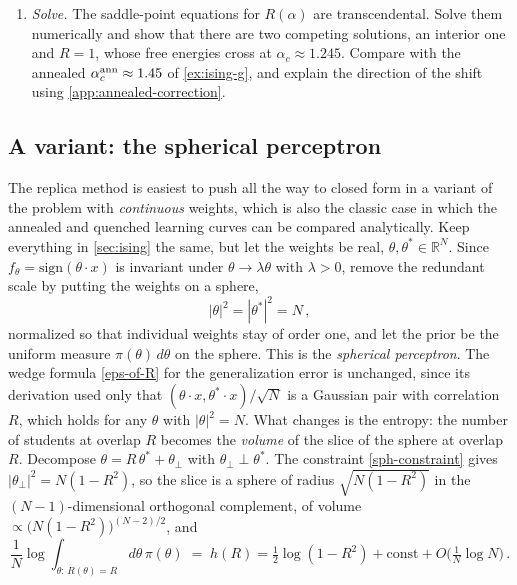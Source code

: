 \documentclass[11pt]{article}
\newcommand{\R}{\mathbb{R}}
\begin{document}
\begin{exercise}
\begin{enumerate}
    \item \emph{Solve.} The saddle-point equations for $R(\alpha)$ are transcendental. Solve them numerically and show that there are two competing solutions, an interior one and $R=1$, whose free energies cross at $\alpha_c\approx1.245$. Compare with the annealed $\alpha_c^{\rm ann}\approx1.45$ of \cref{ex:ising-g}, and explain the direction of the shift using \cref{app:annealed-correction}.
\end{enumerate}
\end{exercise}

\subsection{A variant: the spherical perceptron}
\label{app:sph-perceptron}

The replica method is easiest to push all the way to closed form in a variant of the problem with \emph{continuous} weights, which is also the classic case in which the annealed and quenched learning curves can be compared analytically. Keep everything in \cref{sec:ising} the same, but let the weights be real, $\theta,\theta^*\in\R^N$. Since $f_\theta = \mathrm{sign}(\theta\cdot x)$ is invariant under $\theta\to\lambda\theta$ with $\lambda>0$, remove the redundant scale by putting the weights on a sphere,
%
\begin{equation}
    |\theta|^2 = |\theta^*|^2 = N\,, \label{sph-constraint}
\end{equation}
%
normalized so that individual weights stay of order one, and let the prior be the uniform measure $\pi(\theta)\,d\theta$ on the sphere. This is the \emph{spherical perceptron}. The wedge formula \eqref{eps-of-R} for the generalization error is unchanged, since its derivation used only that $(\theta\cdot x,\theta^*\cdot x)/\sqrt N$ is a Gaussian pair with correlation $R$, which holds for any $\theta$ with $|\theta|^2 = N$. What changes is the entropy: the number of students at overlap $R$ becomes the \emph{volume} of the slice of the sphere at overlap $R$. Decompose $\theta = R\,\theta^* + \theta_\perp$ with $\theta_\perp\perp\theta^*$. The constraint \eqref{sph-constraint} gives $|\theta_\perp|^2 = N(1-R^2)$, so the slice is a sphere of radius $\sqrt{N(1-R^2)}$ in the $(N-1)$-dimensional orthogonal complement, of volume $\propto\big(N(1-R^2)\big)^{(N-2)/2}$, and
%
\begin{equation}
    \frac{1}{N}\log\int_{\theta:\,R(\theta)=R}d\theta\,\pi(\theta) \;=\; h(R) = \tfrac{1}{2}\log(1-R^2) + \text{const} + O\big(\tfrac{1}{N}\log N\big)\,. \label{coarea}
\end{equation}
\end{document}
